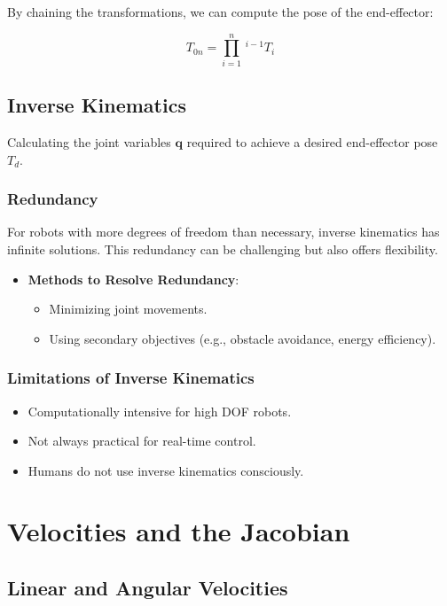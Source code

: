 \documentclass{article}
\begin{document}
By chaining the transformations, we can compute the pose of the end-effector:

$$
T_{0n} = \prod_{i=1}^{n} \,^{i-1}T_i
$$

\subsection{Inverse Kinematics}

Calculating the joint variables $\mathbf{q}$ required to achieve a desired end-effector pose $T_d$.

\subsubsection{Redundancy}

For robots with more degrees of freedom than necessary, inverse kinematics has infinite solutions. This redundancy can be challenging but also offers flexibility.

\begin{itemize}
    \item \textbf{Methods to Resolve Redundancy}:
    \begin{itemize}
        \item Minimizing joint movements.
        \item Using secondary objectives (e.g., obstacle avoidance, energy efficiency).
    \end{itemize}
\end{itemize}

\subsubsection{Limitations of Inverse Kinematics}

\begin{itemize}
    \item Computationally intensive for high DOF robots.
    \item Not always practical for real-time control.
    \item Humans do not use inverse kinematics consciously.
\end{itemize}

\section{Velocities and the Jacobian}

\subsection{Linear and Angular Velocities}
\end{document}

